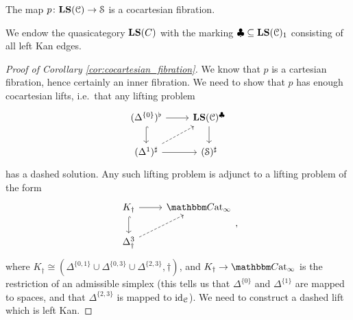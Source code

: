 \documentclass[main.tex]{subfiles}
\begin{document}
\begin{corollary}
  \label{cor:cocartesian_fibration}
  The map $p\colon \mathbf{LS}(\mathcal{C}) \to \mathcal{S}$ is a cocartesian fibration.
\end{corollary}
\begin{notation}
  We endow the quasicategory $\mathbf{LS}(C)$ with the marking $\clubsuit \subseteq \mathbf{LS}(\mathcal{C})_{1}$ consisting of all left Kan edges.
\end{notation}
\begin{proof}[Proof of Corollary \ref{cor:cocartesian_fibration}]
  We know that $p$ is a cartesian fibration, hence certainly an inner fibration. We need to show that $p$ has enough cocartesian lifts, i.e.\ that any lifting problem
  \begin{equation*}
    \begin{tikzcd}
      (\Delta^{\{0\}})^{\flat}
      \arrow[r]
      \arrow[d, hook]
      & \LS(\category{C})^{\clubsuit}
      \arrow[d]
      \\
      (\Delta^{1})^{\sharp}
      \arrow[r]
      \arrow[ur, dashed]
      & (\S)^{\sharp}
    \end{tikzcd}
  \end{equation*}
  has a dashed solution. Any such lifting problem is adjunct to a lifting problem of the form
  \begin{equation}
    \label{eq:unmarked_lifting_problem}
    \begin{tikzcd}
      K_{\dagger}
      \arrow[r]
      \arrow[d, hook]
      & \ICCat
      \\
      \Delta^{3}_{\dagger}
      \arrow[ur, dashed]
    \end{tikzcd},
  \end{equation}
  where $K_{\dagger} \cong (\Delta^{\{0,1\}} \cup \Delta^{\{0,3\}} \cup \Delta^{\{2,3\}}, \dagger)$, and $K_{\dagger} \to \ICCat$ is the restriction of an admissible simplex (this tells us that $\Delta^{\{0\}}$ and $\Delta^{\{1\}}$ are mapped to spaces, and that $\Delta^{\{2,3\}}$ is mapped to $\mathrm{id}_{\mathcal{C}}$). We need to construct a dashed lift which is left Kan.


\end{proof}
\end{document}
